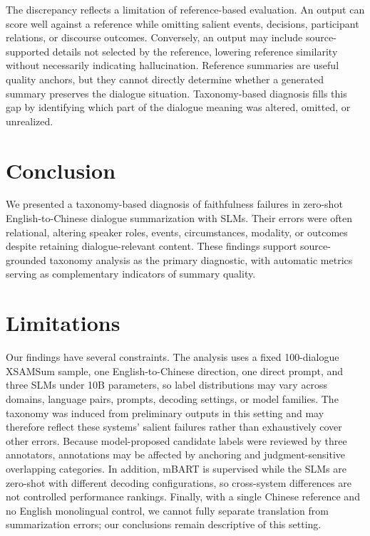 \documentclass[11pt]{article}
\begin{document}
The discrepancy reflects a limitation of reference-based evaluation. An output can score well against a reference while omitting salient events, decisions, participant relations, or discourse outcomes. Conversely, an output may include source-supported details not selected by the reference, lowering reference similarity without necessarily indicating hallucination. Reference summaries are useful quality anchors, but they cannot directly determine whether a generated summary preserves the dialogue situation. Taxonomy-based diagnosis fills this gap by identifying which part of the dialogue meaning was altered, omitted, or unrealized.



\section{Conclusion}

We presented a taxonomy-based diagnosis of faithfulness failures in zero-shot English-to-Chinese dialogue summarization with SLMs. Their errors were often relational, altering speaker roles, events, circumstances, modality, or outcomes despite retaining dialogue-relevant content. These findings support source-grounded taxonomy analysis as the primary diagnostic, with automatic metrics serving as complementary indicators of summary quality.



\section{Limitations}

Our findings have several constraints. The analysis uses a fixed 100-dialogue XSAMSum sample, one English-to-Chinese direction, one direct prompt, and three SLMs under 10B parameters, so label distributions may vary across domains, language pairs, prompts, decoding settings, or model families. The taxonomy was induced from preliminary outputs in this setting and may therefore reflect these systems' salient failures rather than exhaustively cover other errors. Because model-proposed candidate labels were reviewed by three annotators, annotations may be affected by anchoring and judgment-sensitive overlapping categories. In addition, mBART is supervised while the SLMs are zero-shot with different decoding configurations, so cross-system differences are not controlled performance rankings. Finally, with a single Chinese reference and no English monolingual control, we cannot fully separate translation from summarization errors; our conclusions remain descriptive of this setting.
\end{document}
